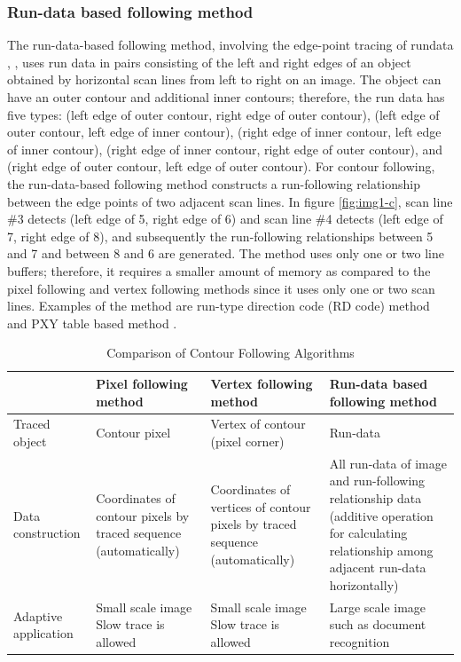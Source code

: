 \subsubsection{Run-data based following method}
The run-data-based following method, involving the edge-point tracing of rundata \cite{Miyatake1997Contour}, \JHMEMO{[13]},  uses run data in pairs consisting of the left and right edges of an object obtained by horizontal scan lines from left to right on an image. The object can have an outer contour and additional inner contours; therefore, the run data has five types: (left edge of outer contour, right edge of outer contour), (left edge of outer contour, left edge of inner contour), (right edge of inner contour, left edge of inner contour), (right edge of inner contour, right edge of outer contour), and (right edge of outer contour, left edge of outer contour). For contour following, the run-data-based following method constructs a run-following relationship between the edge points of two adjacent scan lines. In figure \ref{fig:img1-c}, scan line \#3 detects (left edge of 5, right edge of 6) and scan line \#4 detects (left edge of 7, right edge of 8), and subsequently the run-following relationships between 5 and 7 and between 8 and 6 are generated. The method uses only one or two line buffers; therefore, it requires a smaller amount of memory as compared to the pixel following and vertex following methods since it uses only one or two scan lines. Examples of the method are run-type direction code (RD code) method \cite{Miyatake1997Contour} and PXY table based method \JHMEMO{[13]}. 

\begin{table}[h]
	\begin{tabular}{l|lll}
		& Pixel following method & Vertex following method & Run-data based following method \\ \hline
		Traced object 		& Contour pixel & Vertex of contour (pixel corner) & Run-data \\
		Data construction  	& Coordinates of contour pixels by traced sequence (automatically) & Coordinates of vertices of contour pixels by traced sequence (automatically) & All run-data of image and run-following relationship data (additive operation for calculating relationship among adjacent run-data horizontally) \\
		Adaptive application \cite{Miyatake1997Contour}	& Small scale image Slow trace is allowed	& Small scale image Slow trace is allowed	& Large scale image such as document recognition
	\end{tabular}
	\caption{Comparison of Contour Following Algorithms}
	\label{table:relatedworks}
\end{table}

